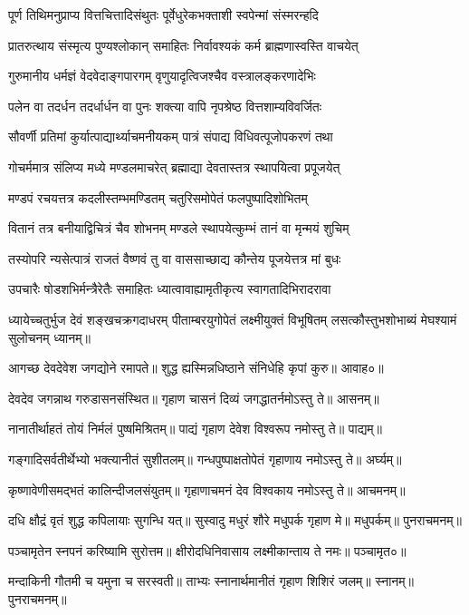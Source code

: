\twolineshloka
{पूर्ण तिथिमनुप्राप्य वित्तचित्तादिसंथुतः}
{पूर्वेधुरेकभक्ताशी स्वपेन्मां संस्मरन्हदि}

\twolineshloka
{प्रातरुत्थाय संस्मृत्य पुण्यश्लोकान् समाहितः}
{निर्वावश्यकं कर्म ब्राह्मणास्वस्ति वाचयेत्}

\twolineshloka
{गुरुमानीय धर्मज्ञं वेदवेदाङ्गपारगम्}
{वृणुयादृत्विजश्चैव वस्त्रालङ्करणादेभिः}

\twolineshloka
{पलेन वा तदर्धन तदर्धार्धन वा पुनः}
{शक्त्या वापि नृपश्रेष्ठ वित्तशाम्यविवर्जितः}

\twolineshloka
{सौवर्णी प्रतिमां कुर्यात्पाद्यार्थ्याचमनीयकम्}
{पात्रं संपाद्य विधिवत्पूजोपकरणं तथा}

\twolineshloka
{गोचर्ममात्र संलिप्य मध्ये मण्डलमाचरेत्}
{ब्रह्माद्या देवतास्तत्र स्थापयित्वा प्रपूजयेत्}

\twolineshloka
{मण्डपं रचयत्तत्र कदलीस्तम्भमण्डितम्}
{चतुरिसमोपेतं फलपुष्पादिशोभितम्}

\twolineshloka
{वितानं तत्र बनीयाद्विचित्रं चैव शोभनम्}
{मण्डले स्थापयेत्कुम्भं तानं वा मृन्मयं शुचिम्}

\twolineshloka
{तस्योपरि न्यसेत्पात्रं राजतं वैष्णवं तु वा}
{वाससाच्छाद्य कौन्तेय पूजयेत्तत्र मां बुधः}

\twolineshloka
{उपचारैः षोडशभिर्मन्त्रैरेतैः समाहितः}
{ध्यात्वावाह्यामृतीकृत्य स्वागतादिभिरादरावा}

\threelineshloka
{ध्यायेच्चतुर्भुज देवं शङ्खचक्रगदाधरम्}
{पीताम्बरयुगोपेतं लक्ष्मीयुक्तं विभूषितम्}
{लसत्कौस्तुभशोभाब्यं मेघश्यामं सुलोचनम्}
ध्यानम्॥

आगच्छ देवदेवेश जगद्योने रमापते॥
शुद्ध ह्यस्मिन्नधिष्ठाने संनिधेहि कृपां कुरु॥
आवाह०॥

देवदेव जगन्नाथ गरुडासनसंस्थित॥
गृहाण चासनं दिव्यं जगद्धातर्नमोऽस्तु ते॥
आसनम्॥

नानातीर्थाहतं तोयं निर्मलं पुष्षमिश्रितम्॥
पाद्यं गृहाण देवेश विश्वरूप नमोस्तु ते॥
पाद्यम्॥

गङ्गादिसर्वतीर्थेभ्यो भक्त्यानीतं सुशीतलम्॥
गन्धपुष्पाक्षतोपेतं गृहाणाय नमोऽस्तु ते॥
अर्घ्यम्॥

कृष्णावेणीसमद्भतं कालिन्दीजलसंयुतम्॥
गृहाणाचमनं देव विश्वकाय नमोऽस्तु ते॥
आचमनम्॥

दधि क्षौद्रं वृतं शुद्ध कपिलायाः सुगन्धि यत्॥
सुस्वादु मधुरं शौरे मधुपर्क गृहाण मे॥
मधुपर्कम्॥
पुनराचमनम्॥

पञ्चामृतेन स्नपनं करिष्यामि सुरोत्तम॥
क्षीरोदधिनिवासाय लक्ष्मीकान्ताय ते नमः॥
पञ्चामृत०॥

मन्दाकिनी गौतमी च यमुना च सरस्वती॥
ताभ्यः स्नानार्थमानीतं गृहाण शिशिरं जलम्॥
स्नानम्॥
पुनराचमनम्॥

